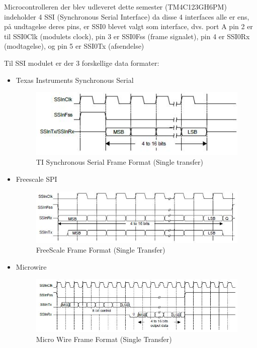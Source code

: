 Microcontrolleren der blev udleveret dette semester (TM4C123GH6PM) indeholder 4 SSI (Synchronous Serial Interface) da disse 4 interfaces alle er ens, på undtagelse deres pins, er SSI0 blevet valgt som interface, dvs. port A pin 2 er til SSI0Clk (modulets clock), pin 3 er SSI0Fss (frame signalet), pin 4 er SSI0Rx (modtagelse), og pin 5 er SSI0Tx (afsendelse)

Til SSI modulet er der 3 forskellige data formater:

\begin{itemize}
	\item Texas Instruments Synchronous Serial
		\begin{figure}[h]
			\begin{center}
			\includegraphics[scale=1]{Billeder/TI_Synchronous_Serial_Frame_Format.jpg}
			\end{center}
			\label{fig:TIFrameFormat}
			\caption{TI Synchronous Serial Frame Format (Single transfer)}
		\end{figure}

	\item Freescale SPI
		\begin{figure}[h]
			\begin{center}
			\includegraphics[scale=1]{Billeder/FS_Frame_Format.jpg}
			\end{center}
			\label{fig:FSFrameFormat}
			\caption{FreeScale Frame Format (Single Transfer)}
		\end{figure}
		  
	\item Microwire
		\begin{figure}[h]
			\begin{center}
			\includegraphics[scale=0.8]{Billeder/MW_Frame_format.jpg}
			\end{center}
			\label{fig:MWFrameFormat}
			\caption{Micro Wire Frame Format (Single Transfer)}
		\end{figure}
\end{itemize}